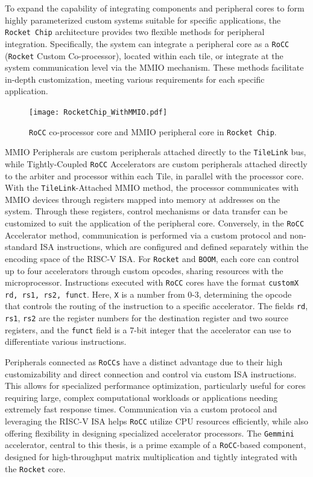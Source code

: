To expand the capability of integrating components and peripheral cores to form highly parameterized custom systems suitable for specific applications, the \texttt{Rocket Chip} architecture provides two flexible methods for peripheral integration. Specifically, the system can integrate a peripheral core as a \texttt{RoCC} (\texttt{Rocket} Custom Co-processor), located within each tile, or integrate at the system communication level via the MMIO mechanism. These methods facilitate in-depth customization, meeting various requirements for each specific application.

\begin{figure}[h!]
    \centering
    \texttt{[image: RocketChip\_WithMMIO.pdf]} %
    \caption{\texttt{RoCC} co-processor core and MMIO peripheral core in \texttt{Rocket Chip}.}
    \label{fig:rocc_mmio_rocketchip}
\end{figure}

MMIO Peripherals are custom peripherals attached directly to the \texttt{TileLink} bus, while Tightly-Coupled \texttt{RoCC} Accelerators are custom peripherals attached directly to the arbiter and processor within each Tile, in parallel with the processor core. With the \texttt{TileLink}-Attached MMIO method, the processor communicates with MMIO devices through registers mapped into memory at addresses on the system. Through these registers, control mechanisms or data transfer can be customized to suit the application of the peripheral core. Conversely, in the \texttt{RoCC} Accelerator method, communication is performed via a custom protocol and non-standard ISA instructions, which are configured and defined separately within the encoding space of the RISC-V ISA. For \texttt{Rocket} and \texttt{BOOM}, each core can control up to four accelerators through custom opcodes, sharing resources with the microprocessor. Instructions executed with \texttt{RoCC} cores have the format \texttt{customX rd, rs1, rs2, funct}. Here, \texttt{X} is a number from 0-3, determining the opcode that controls the routing of the instruction to a specific accelerator. The fields \texttt{rd}, \texttt{rs1}, \texttt{rs2} are the register numbers for the destination register and two source registers, and the \texttt{funct} field is a 7-bit integer that the accelerator can use to differentiate various instructions.

Peripherals connected as \texttt{RoCCs} have a distinct advantage due to their high customizability and direct connection and control via custom ISA instructions. This allows for specialized performance optimization, particularly useful for cores requiring large, complex computational workloads or applications needing extremely fast response times. Communication via a custom protocol and leveraging the RISC-V ISA helps \texttt{RoCC} utilize CPU resources efficiently, while also offering flexibility in designing specialized accelerator processors. The \texttt{Gemmini} accelerator, central to this thesis, is a prime example of a \texttt{RoCC}-based component, designed for high-throughput matrix multiplication and tightly integrated with the \texttt{Rocket} core.

